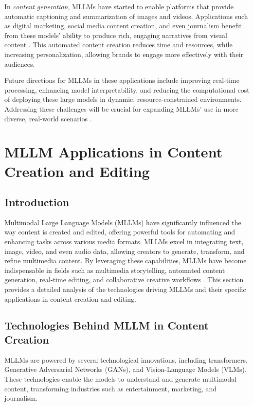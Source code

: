 In \textit{content generation}, MLLMs have started to enable platforms that provide automatic captioning and summarization of images and videos. Applications such as digital marketing, social media content creation, and even journalism benefit from these models' ability to produce rich, engaging narratives from visual content \cite{vs2024zang}. This automated content creation reduces time and resources, while increasing personalization, allowing brands to engage more effectively with their audiences.

Future directions for MLLMs in these applications include improving real-time processing, enhancing model interpretability, and reducing the computational cost of deploying these large models in dynamic, resource-constrained environments. Addressing these challenges will be crucial for expanding MLLMs' use in more diverse, real-world scenarios \cite{yang2024viassist}.

\section{MLLM Applications in Content Creation and Editing}

\subsection{Introduction}

Multimodal Large Language Models (MLLMs) have significantly influenced the way content is created and edited, offering powerful tools for automating and enhancing tasks across various media formats. MLLMs excel in integrating text, image, video, and even audio data, allowing creators to generate, transform, and refine multimedia content. By leveraging these capabilities, MLLMs have become indispensable in fields such as multimedia storytelling, automated content generation, real-time editing, and collaborative creative workflows \cite{vs2024chang}. This section provides a detailed analysis of the technologies driving MLLMs and their specific applications in content creation and editing.

\subsection{Technologies Behind MLLM in Content Creation}

MLLMs are powered by several technological innovations, including transformers, Generative Adversarial Networks (GANs), and Vision-Language Models (VLMs). These technologies enable the models to understand and generate multimodal content, transforming industries such as entertainment, marketing, and journalism. 

